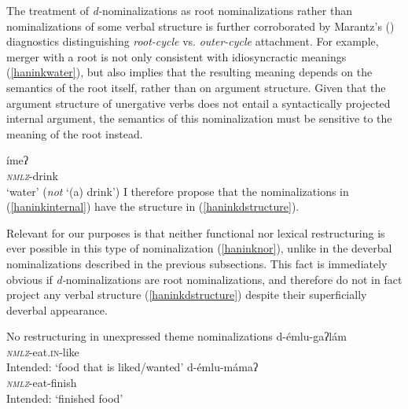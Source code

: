 \documentclass[output=paper]{langscibook}
\begin{document}
\begin{sloppypar}
The treatment of {\itshape d-}nominalizations as root nominalizations rather than nominalizations of some verbal structure is further corroborated by Marantz's (\citeyear{marantz2001}) diagnostics distinguishing {\itshape root-cycle} vs. {\itshape outer-cycle} attachment. For example, merger with a root is not only consistent with idiosyncractic meanings (\ref{haninkwater}), but also implies that the resulting meaning depends on the semantics of the root itself, rather than on argument structure. Given that the argument structure of unergative verbs does not entail a syntactically projected internal argument, the semantics of this nominalization must be sensitive to the meaning of the root instead. 
\end{sloppypar}

\ea {}ímeʔ\\
\textit{\textsc{nmlz}}-drink\\
\glt `water' ({\itshape not} `(a) drink') \label{haninkwater}
\z
I therefore propose that the nominalizations in (\ref{haninkinternal}) have the structure in (\ref{haninkdstructure}).

\ea \label{haninkdstructure}
 \z 
 
Relevant for our purposes is that neither functional nor lexical restructuring is ever possible in this type of nominalization (\ref{haninknor}), unlike in the deverbal nominalizations described in the previous subsections.  This fact is immediately obvious if  {\itshape d-}nominalizations are root nominalizations, and therefore do not in fact project any verbal structure (\ref{haninkdstructure}) despite their superficially deverbal appearance.

\ea No restructuring in unexpressed theme nominalizations\label{haninknor}
\ea \gll *d-émlu-gaʔlám\\
\textit{\textsc{nmlz}}-eat.{\scshape in}-like\\
\glt Intended: `food that is liked/wanted'
\ex \gll *d-émlu-mámaʔ\\
\textit{\textsc{nmlz}}-eat-finish\\
\glt Intended: `finished food' 
\z
\z
 
\end{document}
